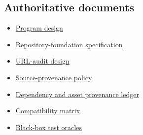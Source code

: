 \documentclass[
  letterpaper,
]{article}
\providecommand{\tightlist}{%
  \setlength{\itemsep}{0pt}\setlength{\parskip}{0pt}}
\begin{document}
\subsection{Authoritative documents}\label{authoritative-documents}

\begin{itemize}
\tightlist
\item
  \href{../specs/password-bonobo-python-reimplementation-design.md}{Program design}
\item
  \href{../specs/password-bonobo-repository-foundation-compatibility-dossier-spec.md}{Repository-foundation
  specification}
\item
  \href{../specs/password-bonobo-url-audit-design.md}{URL-audit design}
\item
  \href{../legal/source-provenance-policy.md}{Source-provenance policy}
\item
  \href{../legal/dependency-asset-provenance-ledger.md}{Dependency and asset provenance ledger}
\item
  \href{../compatibility/gorilla/feature-parity-matrix.md}{Compatibility matrix}
\item
  \href{../compatibility/gorilla/test-oracles.md}{Black-box test oracles}
\end{itemize}
\end{document}
